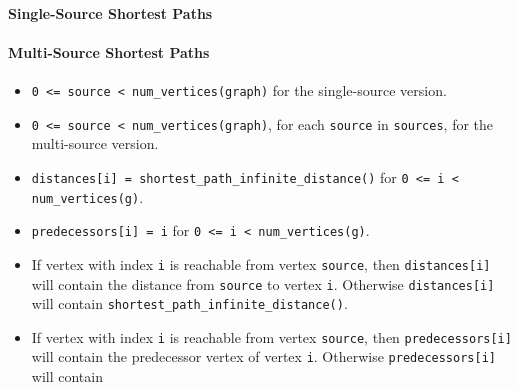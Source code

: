 \paragraph{Single-Source Shortest Paths}
{\small
      
}

\paragraph{Multi-Source Shortest Paths}
{\small
      
}

\begin{itemdescr}
      \pnum\mandates
            \begin{itemize}
                  \item
                        \lstinline{0 <= source < num_vertices(graph)} for the single-source version. 
                  \item
                        \lstinline{0 <= source < num_vertices(graph)}, for each \lstinline{source} in \lstinline{sources}, 
                                   for the multi-source version.
            \end{itemize}
      \pnum\preconditions
            \begin{itemize}
                  \item
                        \lstinline{distances[i] = shortest_path_infinite_distance()} for \lstinline{0 <= i < num_vertices(g)}.
                  \item
                        \lstinline{predecessors[i] = i} for \lstinline{0 <= i < num_vertices(g)}.
            \end{itemize}
      \pnum\effects
            \begin{itemize}
                  \item
                        If vertex with index \lstinline{i} is reachable from vertex \lstinline{source}, then
                        \lstinline{distances[i]} will contain the distance from \lstinline{source} to vertex
                        \lstinline{i}.  Otherwise \lstinline{distances[i]} will contain
                        \lstinline{shortest_path_infinite_distance()}.
                  \item
                        If vertex with index \lstinline{i} is reachable
                        from vertex \lstinline{source}, then \lstinline{predecessors[i]} will contain the
                        predecessor vertex of vertex \lstinline{i}. Otherwise \lstinline{predecessors[i]} will contain

\end{itemize}
\end{itemdescr}
